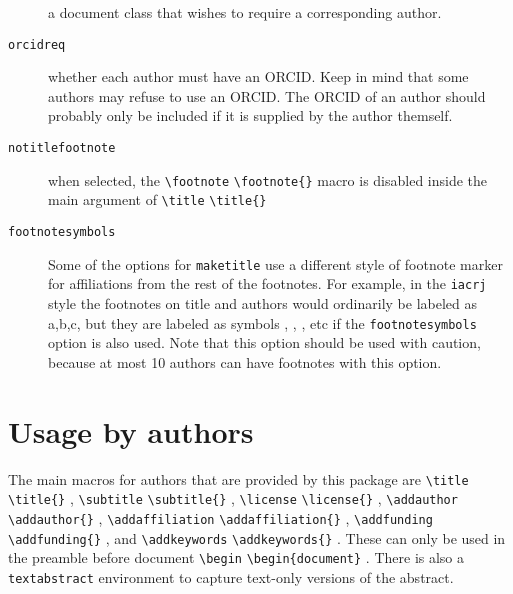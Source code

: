 \documentclass{article}
\newcommand{\cmd}[2][]{%
  \def\FirstArg{#1}%
  \ifx\FirstArg\empty%
    \texttt{\textbackslash{}#2}%
  \else%
    \texttt{\textbackslash{}#2\{#1\}}%
  \fi
}
\begin{document}
\begin{description}
a document class that wishes to require a corresponding author.
\item[\texttt{orcidreq}] whether each author must have an ORCID. Keep in mind that
some authors may refuse to use an ORCID. The ORCID of an author should probably only
be included if it is supplied by the author themself.
\item[\texttt{notitlefootnote}] when selected, the \cmd{footnote} macro is disabled inside
the main argument of \cmd{title}
\item[\texttt{footnotesymbols}] Some of the options for \texttt{maketitle} use a different
style of footnote marker for affiliations from the rest of the footnotes. For example, in the
\texttt{iacrj} style the footnotes on title and authors would ordinarily be 
labeled as a,b,c, but they are labeled as symbols
\textasteriskcentered, \dag, \ddag, etc if the \texttt{footnotesymbols} option is also used.
Note that this option should be used with caution, because at most 10 authors
can have footnotes with this option.
\end{description}
\section{Usage by authors}\label{authorusage}
The main macros for authors that are provided by this package
are \cmd{title}, \cmd{subtitle}, \cmd{license}, \cmd{addauthor},
\cmd{addaffiliation}, \cmd{addfunding}, and \cmd{addkeywords}.
These can only be used in the preamble before \cmd[document]{begin}.
There is also a \texttt{textabstract} environment
to capture text-only versions of the abstract.
\end{document}
